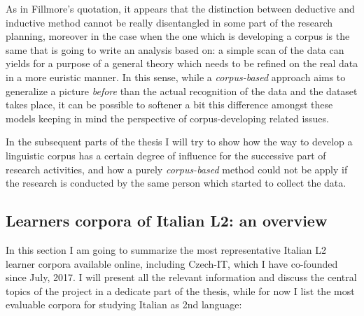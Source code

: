 \documentclass[
  a4paper,
  twoside,
  12pt,
  chapterprefix=false,
  bibliography=totocnumbered,
  listof=flat]{scrbook}
\begin{document}
As in Fillmore's quotation, it appears that the distinction between deductive and inductive method cannot be really disentangled in some part of the research planning, moreover in the case when the one which is developing a corpus is the same that is going to write an analysis based on: a simple scan of the data can yields for a purpose of a general theory which needs to be refined on the real data in a more euristic manner.
In this sense, while a \emph{corpus-based} approach aims to generalize a picture \emph{before} than the actual recognition of the data and the dataset takes place, it can be possible to softener a bit this difference amongst these models keeping in mind the perspective of corpus-developing related issues.

In the subsequent parts of the thesis I will try to show how the way to develop a linguistic corpus has a certain degree of influence for the successive part of research activities, and how a purely \emph{corpus-based} method could not be apply if the research is conducted by the same person which started to collect the data.

\hypertarget{learners-corpora-of-italian-l2-an-overview}{%
\subsection{Learners corpora of Italian L2: an overview}\label{learners-corpora-of-italian-l2-an-overview}}

In this section I am going to summarize the most representative Italian L2 learner corpora available online, including Czech-IT, which I have co-founded since July, 2017. I will present all the relevant information and discuss the central topics of the project in a dedicate part of the thesis, while for now I list the most evaluable corpora for studying Italian as 2nd language:
\end{document}
